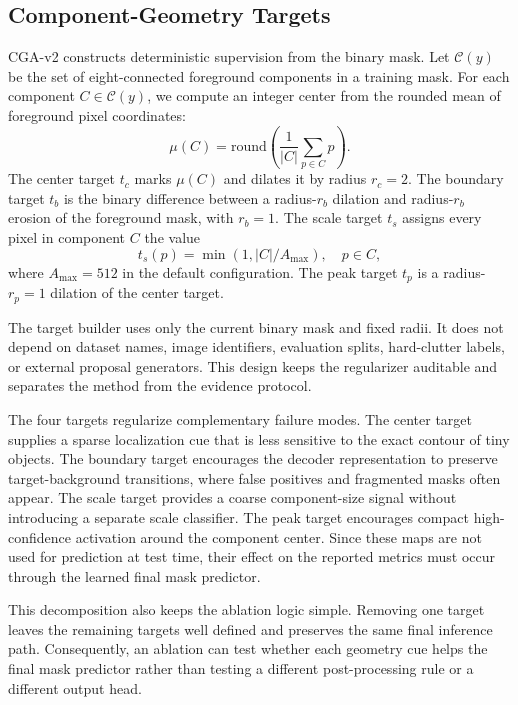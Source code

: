 \documentclass[letterpaper]{article}
\begin{document}
\subsection{Component-Geometry Targets}

CGA-v2 constructs deterministic supervision from the binary mask. Let $\mathcal{C}(y)$ be the set of eight-connected foreground components in a training mask. For each component $C \in \mathcal{C}(y)$, we compute an integer center from the rounded mean of foreground pixel coordinates:
\begin{equation}
\mu(C)=\mathrm{round}\left(\frac{1}{|C|}\sum_{p\in C}p\right).
\end{equation}
The center target $t_c$ marks $\mu(C)$ and dilates it by radius $r_c=2$. The boundary target $t_b$ is the binary difference between a radius-$r_b$ dilation and radius-$r_b$ erosion of the foreground mask, with $r_b=1$. The scale target $t_s$ assigns every pixel in component $C$ the value
\begin{equation}
t_s(p) = \min(1, |C| / A_{\max}), \quad p \in C,
\end{equation}
where $A_{\max}=512$ in the default configuration. The peak target $t_p$ is a radius-$r_p=1$ dilation of the center target.

The target builder uses only the current binary mask and fixed radii. It does not depend on dataset names, image identifiers, evaluation splits, hard-clutter labels, or external proposal generators. This design keeps the regularizer auditable and separates the method from the evidence protocol.

The four targets regularize complementary failure modes. The center target supplies a sparse localization cue that is less sensitive to the exact contour of tiny objects. The boundary target encourages the decoder representation to preserve target-background transitions, where false positives and fragmented masks often appear. The scale target provides a coarse component-size signal without introducing a separate scale classifier. The peak target encourages compact high-confidence activation around the component center. Since these maps are not used for prediction at test time, their effect on the reported metrics must occur through the learned final mask predictor.

This decomposition also keeps the ablation logic simple. Removing one target leaves the remaining targets well defined and preserves the same final inference path. Consequently, an ablation can test whether each geometry cue helps the final mask predictor rather than testing a different post-processing rule or a different output head.
\end{document}
